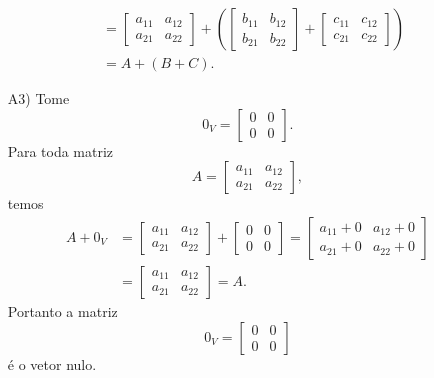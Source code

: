 \documentclass[12pt]{exam}
\begin{document}
\begin{itemize}
\begin{align*}
            \\ &= \begin{bmatrix} a_{11} & a_{12}\\a_{21} & a_{22}\end{bmatrix} +
            \left(\begin{bmatrix} b_{11} & b_{12}\\b_{21} & b_{22}\end{bmatrix} +
            \begin{bmatrix} c_{11} & c_{12}\\c_{21} & c_{22}\end{bmatrix}\right)
            \\ &= A + (B + C).
        \end{align*}

        \item[A3)] Tome
        \[
        0_V = \begin{bmatrix}0 & 0\\0 & 0\end{bmatrix}.
        \]
        Para toda matriz
        \[
        A = \begin{bmatrix} a_{11} & a_{12}\\a_{21} & a_{22}\end{bmatrix},
        \]
        temos
        \begin{align*}
            A + 0_V & = \begin{bmatrix} a_{11} & a_{12}\\a_{21} & a_{22}\end{bmatrix} +
            \begin{bmatrix}0 & 0\\0 & 0\end{bmatrix}
            = \begin{bmatrix}a_{11} + 0 & a_{12} + 0\\a_{21} + 0  & a_{22} + 0\end{bmatrix}
            \\ &= \begin{bmatrix} a_{11} & a_{12}\\a_{21} & a_{22}\end{bmatrix} = A.
        \end{align*}
        Portanto a matriz
        \[
        0_V = \begin{bmatrix}0 & 0\\0 & 0\end{bmatrix}
        \]
        é o vetor nulo.


\end{itemize}
\end{document}
